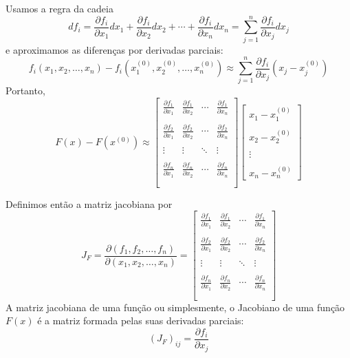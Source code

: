 Usamos a regra da cadeia
$$df_i = \frac{\partial f_i}{\partial x_1} dx_1+\frac{\partial f_i}{\partial x_2} dx_2+\cdots + \frac{\partial f_i}{\partial x_n} dx_n=\sum_{j=1}^n\frac{\partial f_i}{\partial x_j} dx_j$$
e aproximamos as diferenças por derivadas parciais:
$$ f_i(x_1,x_2,\ldots,x_n)-f_i(x_1^{(0)},x_2^{(0)},\ldots,x_n^{(0)})\approx \sum_{j=1}^n \frac{\partial f_i}{\partial x_j}\left(x_j-x_j^{(0)}\right)$$
Portanto,
\begin{equation}\label{eq_approx_newton}F(x)-F(x^{(0)})\approx \left[
\begin{array}{ccccc}
\frac{\partial f_1}{\partial x_1}&\frac{\partial f_1}{\partial x_2}&\cdots&\frac{\partial f_1}{\partial x_n}\\~\\
\frac{\partial f_2}{\partial x_1}&\frac{\partial f_2}{\partial x_2}&\cdots&\frac{\partial f_2}{\partial x_n}\\~\\
\vdots&\vdots&\ddots&\vdots\\~\\
\frac{\partial f_n}{\partial x_1}&\frac{\partial f_n}{\partial x_2}&\cdots&\frac{\partial f_n}{\partial x_n}\\~\\
\end{array}
\right]\left[
\begin{array}{c}
x_1-x_1^{(0)}\\~~\\
x_2-x_2^{(0)}\\~~\\
\vdots\\~~\\
x_n-x_n^{(0)}
\end{array}
\right]
\end{equation}

Definimos então a matriz jacobiana por
$$J_F= \frac{\partial(f_1,f_2,\ldots,f_n)}{\partial(x_1,x_2,\ldots,x_n)}=\left[
\begin{array}{ccccc}
\frac{\partial f_1}{\partial x_1}&\frac{\partial f_1}{\partial x_2}&\cdots&\frac{\partial f_1}{\partial x_n}\\~\\
\frac{\partial f_2}{\partial x_1}&\frac{\partial f_2}{\partial x_2}&\cdots&\frac{\partial f_2}{\partial x_n}\\~\\
\vdots&\vdots&\ddots&\vdots\\~\\
\frac{\partial f_n}{\partial x_1}&\frac{\partial f_n}{\partial x_2}&\cdots&\frac{\partial f_n}{\partial x_n}\\~\\
\end{array}
\right]
$$
A matriz jacobiana de uma função ou simplesmente, o Jacobiano de uma função $F(x)$ é a matriz formada pelas suas derivadas parciais:
$$\left(J_F\right)_{ij}=\frac{\partial f_i}{\partial x_j}$$

